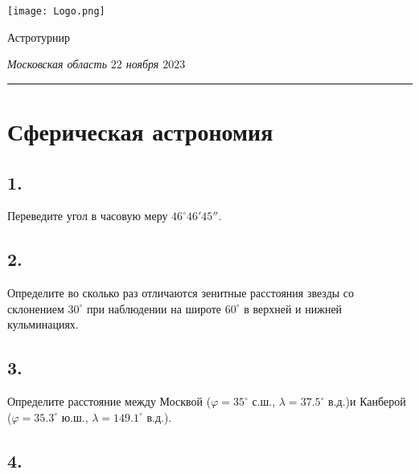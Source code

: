 \documentclass[a4paper,12pt]{article}
\begin{document}
	
	\begin{minipage}{0.15 \textwidth}
		\texttt{[image: Logo.png]}
	\end{minipage}
	\begin{minipage}{0.85 \textwidth}
		\begin{center}
			\begin{Huge}
				Астротурнир
			\end{Huge}
			
			\bigskip
			
			\begin{Large}
				\textit{Московская область} \hspace{25 pt}
				\textit{$22$ ноября $2023$}
			\end{Large}
			
		\end{center}
	\end{minipage}
	
	\bigskip
	
	\hrule
	
\section*{Сферическая астрономия}

\subsection*{1.}

Переведите угол в часовую меру $46^{\circ} 46' 45''$.


\subsection*{2. }

Определите во сколько раз отличаются зенитные расстояния звезды  со склонением $30^{\circ}$ при наблюдении на широте $60^{\circ}$ в верхней и нижней кульминациях.


\subsection*{3. }

Определите расстояние между Москвой ($\varphi = 35^{\circ}$ с.ш., $\lambda = 37.5^{\circ}$ в.д.)и  Канберой ($\varphi = 35.3^{\circ}$ ю.ш., $\lambda = 149.1^{\circ}$ в.д.).

\subsection*{4. }
\end{document}
